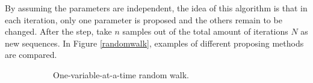 By assuming the parameters are independent, the idea of this algorithm is that in each iteration, only one parameter is proposed and the others remain to be changed. After the step, take $n$ samples out of the total amount of iterations $N$ as new sequences. In Figure \ref{randomwalk}, examples of different proposing methods are compared. 
\begin{figure}[h]
\centering
 \begin{subfigure}[b]{0.32\textwidth}
  \caption{\footnotesize One-variable-at-a-time random walk.}\label{MCMConevariableRW}
\end{subfigure}
\begin{subfigure}[b]{0.32\textwidth}
\end{subfigure}
\end{figure}
